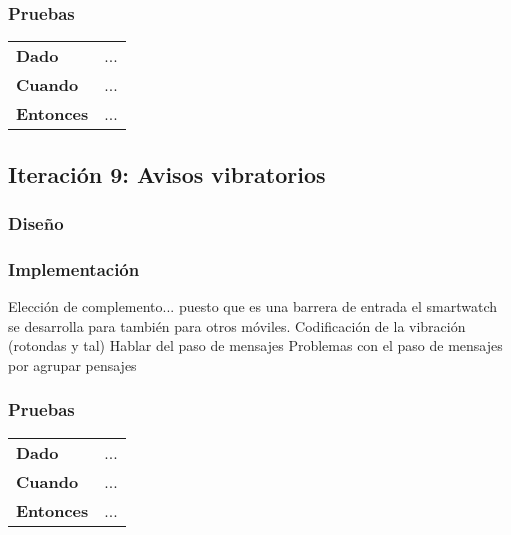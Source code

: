 \subsubsection{Pruebas}
\begin{tabular}{p{}p{}}
  \hline
  \textbf{Dado}     & ... \\
  \textbf{Cuando}   & ... \\
  \textbf{Entonces} & ... \\
  \hline
\end{tabular}

\subsection{Iteración 9: Avisos vibratorios}
\subsubsection{Diseño}
\subsubsection{Implementación}
Elección de complemento... puesto que es una barrera de entrada el smartwatch se desarrolla para
también para otros móviles.
Codificación de la vibración (rotondas y tal)
Hablar del paso de mensajes
Problemas con el paso de mensajes por agrupar pensajes

\subsubsection{Pruebas}
\begin{tabular}{p{}p{}}
  \hline
  \textbf{Dado}     & ... \\
  \textbf{Cuando}   & ... \\
  \textbf{Entonces} & ... \\
  \hline
\end{tabular}

